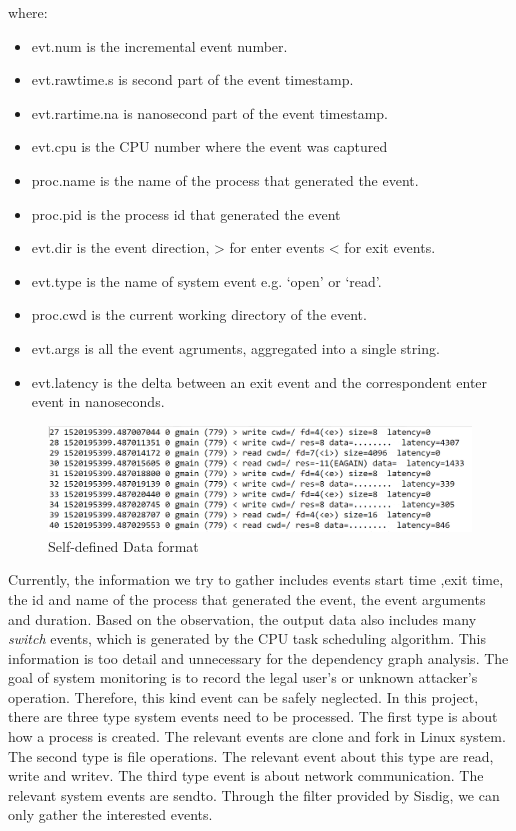where:
\begin{itemize}[noitemsep]
	\item evt.num is the incremental event number.
	\item evt.rawtime.s is second part of the event timestamp.
	\item evt.rartime.na is nanosecond part of the event timestamp.
	\item evt.cpu is the CPU number where the event was captured
	\item proc.name is the name of the process that generated the event.
	\item proc.pid is the process id that generated the event
	\item evt.dir is the event direction, > for enter events < for exit events.
	\item evt.type is the name of system event e.g. `open' or `read'.
	\item proc.cwd is the current working directory of the event.
	\item evt.args is all the event agruments, aggregated into a single string.
	\item evt.latency is the delta between an exit event and the correspondent enter event in nanoseconds.
\end{itemize}
\begin{figure}
	\centering
	\includegraphics[scale=0.4]{fig2}
	\caption{Self-defined Data format}
\end{figure}
Currently, the information we try to gather includes events start time ,exit time, the id and name of the process that generated the event, the event arguments and duration. Based on the observation, the output data also includes many \textit{switch} events, which is generated by the CPU task scheduling algorithm. This information is too detail and unnecessary for the dependency graph analysis. The goal of system monitoring is to record the legal user's or unknown attacker's operation. Therefore, this  kind event can be safely neglected. In this project, there are three type system events need to be processed. The first type is about how a process is created. The relevant events are clone and fork in Linux system. The second type is file operations. The relevant event about this type are read, write and writev. The third type event is about network communication. The relevant system events are sendto. Through the filter provided by Sisdig, we can only gather the interested events.
